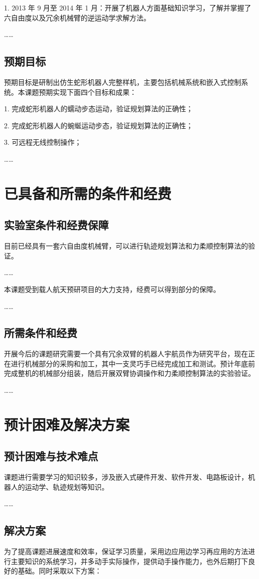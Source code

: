 1. 2013 年 9 月至 2014 年 1 月：开展了机器人方面基础知识学习，了解并掌握了六自由度以及冗余机械臂的逆运动学求解方法。

……

\subsection{预期目标}
预期目标是研制出仿生蛇形机器人完整样机，主要包括机械系统和嵌入式控制系统。本课题预期实现下面四个目标和成果：

1. 完成蛇形机器人的蠕动步态运动，验证规划算法的正确性；

2. 完成蛇形机器人的蜿蜒运动步态，验证规划算法的正确性；

3. 可远程无线控制操作；

……

\section{已具备和所需的条件和经费}
\subsection{实验室条件和经费保障}
目前已经具有一套六自由度机械臂，可以进行轨迹规划算法和力柔顺控制算法的验证。

……

本课题受到载人航天预研项目的大力支持，经费可以得到部分的保障。

……

\subsection{所需条件和经费}
开展今后的课题研究需要一个具有冗余双臂的机器人宇航员作为研究平台，现在正在进行机械部分的采购和加工，其中一支灵巧手已经完成加工和测试。预计年底前完成整机的机械部分组装，随后开展双臂协调操作和力柔顺控制算法的实验验证。

……

\section{预计困难及解决方案}
\subsection{预计困难与技术难点}
课题进行需要学习的知识较多，涉及嵌入式硬件开发、软件开发、电路板设计，机器人的运动学、轨迹规划等知识。

……

\subsection{解决方案}
为了提高课题进展速度和效率，保证学习质量，采用边应用边学习再应用的方法进行主要知识的系统学习，并多动手实际操作，提供动手操作能力，也外后期打下良好的基础。同时采取以下方案：

